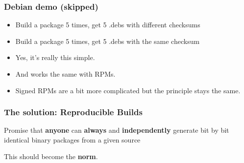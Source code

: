 \documentclass[14pt,aspectratio=169]{beamer}
\newif\ifplacelogo
\begin{document}
\begin{frame}
 \frametitle{Debian demo (skipped)}
 \begin{itemize}
 \item Build a package 5 times, get 5 .debs with different checksums
 \item Build a package 5 times, get 5 .debs with the same checksum\\
 \item<2-4>{Yes, it's really this simple.}
 \item<3-4>{And works the same with RPMs.}
 \item<4>{Signed RPMs are a bit more complicated but the principle stays the
same.}
 \end{itemize}
%
%
\end{frame}

\placelogofalse

\begin{frame}
 \frametitle{The solution: Reproducible Builds}

 \begin{center}
 \Large{
 Promise that \textbf{anyone} can \textbf{always} and \textbf{independently} generate
 bit by bit identical binary packages from a given source}
\end{center}
\end{frame}


\begin{frame}[plain]
\begin{center}
 \Huge{This should become the \textbf{norm}.}

\end{center}
\end{frame}
\end{document}
